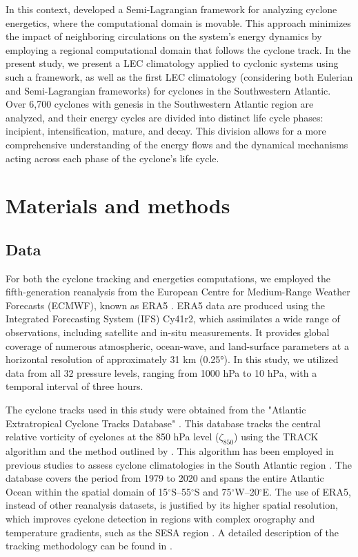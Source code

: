 \documentclass[pdflatex,sn-chicago]{sn-jnl}%
\theoremstyle{plain}
\theoremstyle{definition}
\theoremstyle{remark}
\theoremstyle{definition}
\begin{document}
In this context, \citet{michaelides1999quasi} developed a Semi-Lagrangian framework for analyzing cyclone energetics, where the computational domain is movable. This approach minimizes the impact of neighboring circulations on the system's energy dynamics by employing a regional computational domain that follows the cyclone track. In the present study, we present a LEC climatology applied to cyclonic systems using such a framework, as well as the first LEC climatology (considering both Eulerian and Semi-Lagrangian frameworks) for cyclones in the Southwestern Atlantic. Over 6,700 cyclones with genesis in the Southwestern Atlantic region are analyzed, and their energy cycles are divided into distinct life cycle phases: incipient, intensification, mature, and decay. This division allows for a more comprehensive understanding of the energy flows and the dynamical mechanisms acting across each phase of the cyclone's life cycle.

\section{Materials and methods}

\subsection{Data}\label{sec:data}

For both the cyclone tracking and energetics computations, we employed the fifth-generation reanalysis from the European Centre for Medium-Range Weather Forecasts (ECMWF), known as ERA5 \citep{hersbach2020era5}. ERA5 data are produced using the Integrated Forecasting System (IFS) Cy41r2, which assimilates a wide range of observations, including satellite and in-situ measurements. It provides global coverage of numerous atmospheric, ocean-wave, and land-surface parameters at a horizontal resolution of approximately 31 km (0.25°). In this study, we utilized data from all 32 pressure levels, ranging from 1000 hPa to 10 hPa, with a temporal interval of three hours.

The cyclone tracks used in this study were obtained from the "Atlantic Extratropical Cyclone Tracks Database" \citep{gramcianinov2020data}. This database tracks the central relative vorticity of cyclones at the 850 hPa level (\(\zeta_{850}\)) using the TRACK algorithm \citep{hodges1994general, hodges1995feature} and the method outlined by \citet{hoskins2002new}. This algorithm has been employed in previous studies to assess cyclone climatologies in the South Atlantic region \citep{gramcianinov2019properties,gramcianinov2020analysis,couto2024new}. The database covers the period from 1979 to 2020 and spans the entire Atlantic Ocean within the spatial domain of 15\(^\circ\)S–55\(^\circ\)S and 75\(^\circ\)W–20\(^\circ\)E. The use of ERA5, instead of other reanalysis datasets, is justified by its higher spatial resolution, which improves cyclone detection in regions with complex orography and temperature gradients, such as the SESA region \citep{gramcianinov2020analysis}. A detailed description of the tracking methodology can be found in \citet{gramcianinov2020analysis}.
\end{document}
